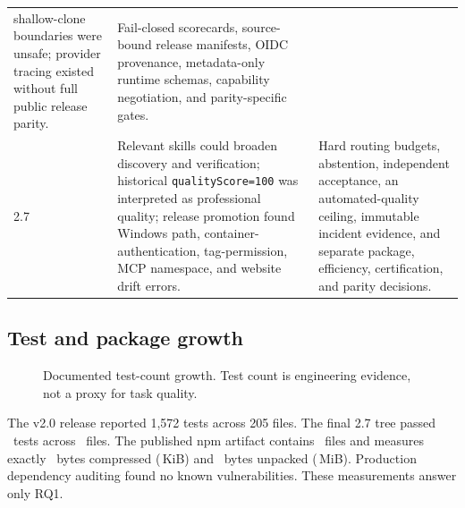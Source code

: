 \documentclass[10pt,twocolumn]{article}
\begin{document}
\begin{table}[t]
\begin{tabularx}{\textwidth}{@{}p{}p{}X@{}}
shallow-clone boundaries were unsafe; provider tracing existed without full
public release parity. &
Fail-closed scorecards, source-bound release manifests, OIDC provenance,
metadata-only runtime schemas, capability negotiation, and parity-specific
gates. \\
2.7 & Relevant skills could broaden discovery and verification; historical
\texttt{qualityScore=100} was interpreted as professional quality; release
promotion found Windows path, container-authentication, tag-permission, MCP
namespace, and website drift errors. &
Hard routing budgets, abstention, independent acceptance, an automated-quality
ceiling, immutable incident evidence, and separate package, efficiency,
certification, and parity decisions. \\
\bottomrule
\end{tabularx}
\end{table}

\subsection{Test and package growth}

\begin{figure}[t]
\centering
{}
\caption{Documented test-count growth. Test count is engineering evidence, not
a proxy for task quality.}
\label{fig:testgrowth}
\end{figure}

The v2.0 release reported 1,572 tests across 205 files. The final 2.7 tree
passed \FinalTests\ tests across \FinalTestFiles\ files. The published npm
artifact contains \PackageFileCount\ files and measures exactly
\PackageCompressedBytes\ bytes compressed (\PackageCompressedKiB\,KiB) and
\PackageUnpackedBytes\ bytes unpacked (\PackageUnpackedMiB\,MiB). Production
dependency auditing found no known vulnerabilities. These measurements answer
only RQ1.
\end{document}
